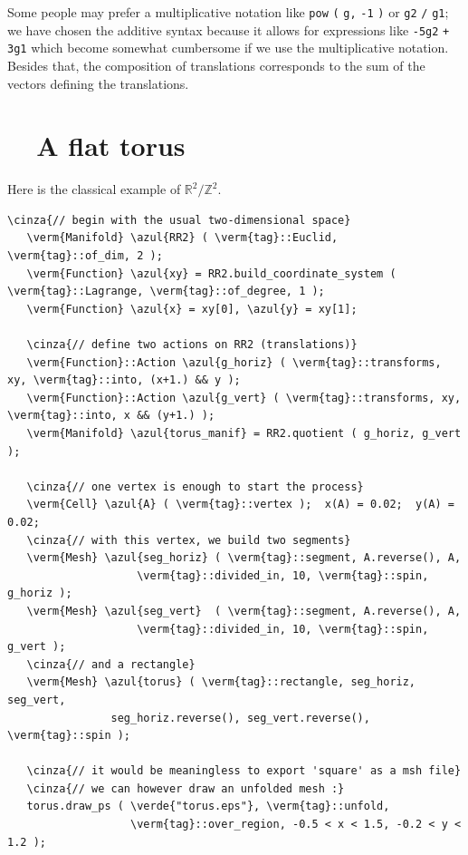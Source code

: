 Some people may prefer a multiplicative notation like {\small\tt pow} {\small\tt (} {\small\tt g,}
{\small\tt -1} {\small\tt )} or {\small\tt g2} {\small\tt /} {\small\tt g1};
we have chosen the additive syntax because it allows for expressions like {\small\tt -5g2}
{\small\tt +} {\small\tt 3g1} which become somewhat cumbersome if we use the multiplicative notation.
Besides that, the composition of translations corresponds to the sum of the vectors
defining the translations.


\section{~~A flat torus}\label{\numb section 7.\numb parag 4}

Here is the classical example of $ \mathbb{R}^2/{\mathbb Z}^2 $.

\begin{Verbatim}[commandchars=\\\{\},formatcom=\small\tt,frame=single,
   label=parag-\ref{\numb section 7.\numb parag 4}.cpp,rulecolor=\color{coment},
   baselinestretch=0.94,framesep=2mm                                            ]
   \cinza{// begin with the usual two-dimensional space}
   \verm{Manifold} \azul{RR2} ( \verm{tag}::Euclid, \verm{tag}::of_dim, 2 );
   \verm{Function} \azul{xy} = RR2.build_coordinate_system ( \verm{tag}::Lagrange, \verm{tag}::of_degree, 1 );
   \verm{Function} \azul{x} = xy[0], \azul{y} = xy[1];

   \cinza{// define two actions on RR2 (translations)}
   \verm{Function}::Action \azul{g_horiz} ( \verm{tag}::transforms, xy, \verm{tag}::into, (x+1.) && y );
   \verm{Function}::Action \azul{g_vert} ( \verm{tag}::transforms, xy, \verm{tag}::into, x && (y+1.) );
   \verm{Manifold} \azul{torus_manif} = RR2.quotient ( g_horiz, g_vert );

   \cinza{// one vertex is enough to start the process}
   \verm{Cell} \azul{A} ( \verm{tag}::vertex );  x(A) = 0.02;  y(A) = 0.02;
   \cinza{// with this vertex, we build two segments}
   \verm{Mesh} \azul{seg_horiz} ( \verm{tag}::segment, A.reverse(), A,
                    \verm{tag}::divided_in, 10, \verm{tag}::spin, g_horiz );
   \verm{Mesh} \azul{seg_vert}  ( \verm{tag}::segment, A.reverse(), A,
                    \verm{tag}::divided_in, 10, \verm{tag}::spin, g_vert );
   \cinza{// and a rectangle}
   \verm{Mesh} \azul{torus} ( \verm{tag}::rectangle, seg_horiz, seg_vert,
                seg_horiz.reverse(), seg_vert.reverse(), \verm{tag}::spin );

   \cinza{// it would be meaningless to export 'square' as a msh file}
   \cinza{// we can however draw an unfolded mesh :}
   torus.draw_ps ( \verde{"torus.eps"}, \verm{tag}::unfold,
                   \verm{tag}::over_region, -0.5 < x < 1.5, -0.2 < y < 1.2 );
\end{Verbatim}

